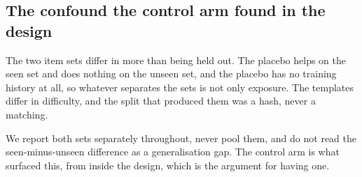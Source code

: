 \subsection{The confound the control arm found in the design}

The two item sets differ in more than being held out. The placebo helps on the
seen set and does nothing on the unseen set, and the placebo has no training
history at all, so whatever separates the sets is not only exposure. The
templates differ in difficulty, and the split that produced them was a hash,
never a matching.

We report both sets separately throughout, never pool them, and do not read
the seen-minus-unseen difference as a generalisation gap. The control arm is
what surfaced this, from inside the design, which is the argument for having
one.
